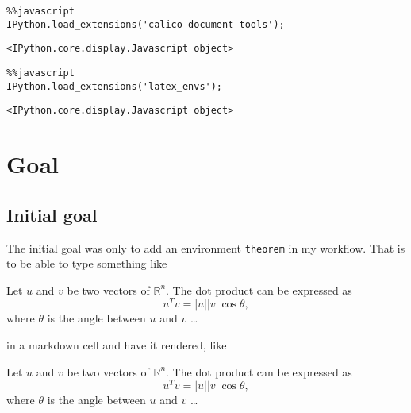 
    
    
    
    


    

\begin{lstlisting}
%%javascript 
IPython.load_extensions('calico-document-tools');
\end{lstlisting}%
%
    
    \begin{verbatim}
<IPython.core.display.Javascript object>
    \end{verbatim}

\begin{lstlisting}
%%javascript 
IPython.load_extensions('latex_envs');
\end{lstlisting}%
%
    
    \begin{verbatim}
<IPython.core.display.Javascript object>
    \end{verbatim}

    
    \section{Goal}\label{goal}

    \subsection{Initial goal}\label{initial-goal}

    The initial goal was only to add an environment \texttt{theorem} in my
workflow. That is to be able to type something like

\begin{listing}
\begin{theorem}
Let $u$ and $v$ be two vectors of $\mathbb{R}^n$. The dot product can be
expressed as \begin{equation}u^Tv = |u||v| \cos \theta,\end{equation} where $\theta$ is the angle
between $u$ and $v$ \ldots{}
\end{theorem}
\end{listing}

in a markdown cell and have it rendered, like

\begin{theorem}
Let $u$ and $v$ be two vectors of $\mathbb{R}^n$. The dot product can be
expressed as \begin{equation}u^Tv = |u||v| \cos \theta,\end{equation} where $\theta$ is the angle
between $u$ and $v$ \ldots{}
\end{theorem}

